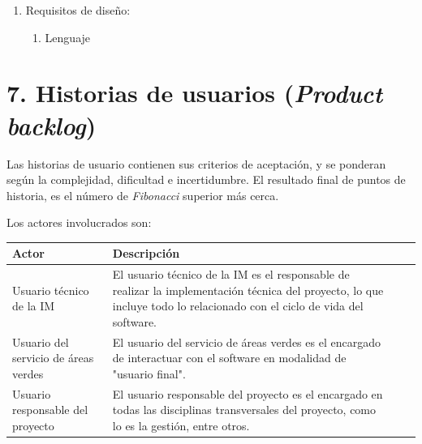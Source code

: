 \documentclass[
11pt, %
]{charter}
\begin{document}
\begin{enumerate}
  \item Requisitos de diseño:
        \begin{enumerate}
          \item Lenguaje
        \end{enumerate}
\end{enumerate}

\section{7. Historias de usuarios (\textit{Product backlog})}
\label{sec:backlog}

Las historias de usuario contienen sus criterios de aceptación, y se ponderan según la complejidad, dificultad e incertidumbre.
El resultado final de puntos de historia, es el número de \textit{Fibonacci} superior más cerca.

Los actores involucrados son:

\begin{table}[ht]
  \begin{tabularx}{\linewidth}{@{}|l|X|X|l|@{}}
    \hline
    \rowcolor[HTML]{C0C0C0}
    Actor                                & Descripción                                                                                                                                                             \\ \hline
    Usuario técnico de la IM             & El usuario técnico de la IM es el responsable de realizar la implementación técnica del proyecto, lo que incluye todo lo relacionado con el ciclo de vida del software. \\ \hline
    Usuario del servicio de áreas verdes & El usuario del servicio de áreas verdes es el encargado de interactuar con el software en modalidad de "usuario final".                                                 \\ \hline
    Usuario responsable del proyecto     & El usuario responsable del proyecto es el encargado en todas las disciplinas transversales del proyecto, como lo es la gestión, entre otros.                            \\ \hline
  \end{tabularx}
\end{table}
\end{document}

